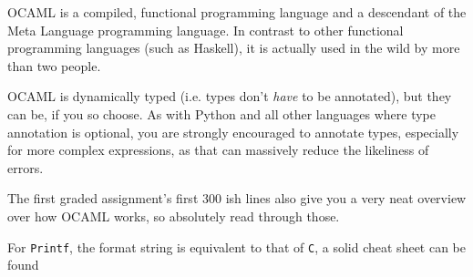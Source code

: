 OCAML is a compiled, functional programming language and a descendant of the Meta Language programming language.
In contrast to other functional programming languages (such as Haskell), it is actually used in the wild by more than two people.


OCAML is dynamically typed (i.e. types don't \textit{have} to be annotated), but they can be, if you so choose.
As with Python and all other languages where type annotation is optional, you are strongly encouraged to annotate types, especially for more complex expressions,
as that can massively reduce the likeliness of errors.

The first graded assignment's first 300 ish lines also give you a very neat overview over how OCAML works,
so absolutely read through those.

For \texttt{Printf}, the format string is equivalent to that of \texttt{C},
a solid cheat sheet can be found 
